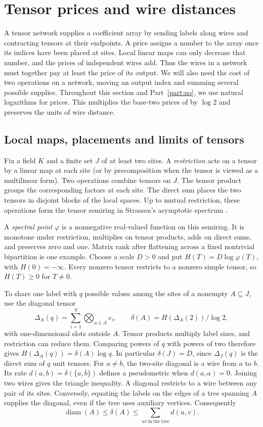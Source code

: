 \section{Tensor prices and wire distances}\label{sec:prices}

A tensor network supplies a coefficient array by sending labels along
wires and contracting tensors at their endpoints. A price assigns a
number to the array once its indices have been placed at sites. Local
linear maps can only decrease that number, and the prices of independent
wires add. Thus the wires in a network must together pay at least the
price of its output. We will also need the cost of two operations on a
network, moving an output index and summing several possible supplies.
Throughout this section and Part~\ref{part:no}, we use natural logarithms
for prices. This multiplies the base-two prices of \cite{oaG} by
$\log 2$ and preserves the units of wire distance.

\subsection{Local maps, placements and limits of tensors}

Fix a field $K$ and a finite set $J$ of at least two sites. A
\emph{restriction} acts on a tensor by a linear map at each site
(or by precomposition when the tensor is viewed as a multilinear
form). Two operations combine tensors on $J$. The tensor product
groups the corresponding factors at each site. The direct sum places
the two tensors in disjoint blocks of the local spaces. Up to mutual
restriction, these operations form the tensor semiring in Strassen's
asymptotic spectrum \cite{Strassen}.

A \emph{spectral point} $\varphi$ is a nonnegative real-valued
function on this semiring. It is monotone under restriction,
multiplies on tensor products, adds on direct sums, and preserves
zero and one. Matrix rank after flattening across a fixed nontrivial
bipartition is one example. Choose a scale $D>0$ and put
$H(T)=D\log\varphi(T)$, with $H(0)=-\infty$. Every nonzero tensor
restricts to a nonzero simple tensor, so $H(T)\ge0$ for $T\ne0$.

To share one label with $q$ possible values among the sites of a
nonempty $A\subseteq J$, use the diagonal tensor
\[
 \Delta_A(q)=\sum_{i=1}^q\bigotimes_{a\in A}e_i,\qquad
 \delta(A)=H(\Delta_A(2))/\log 2 ,
\]
with one-dimensional slots outside $A$. Tensor products multiply
label sizes, and restriction can reduce them. Comparing powers of
$q$ with powers of two therefore gives $H(\Delta_A(q))=\delta(A)\log q$.
In particular $\delta(J)=D$, since $\Delta_J(q)$ is the direct sum of
$q$ unit tensors. For $a\ne b$, the two-site diagonal is a wire from
$a$ to $b$. Its rate $d(a,b)=\delta(\{a,b\})$ defines a pseudometric
when $d(a,a)=0$. Joining two wires gives the triangle inequality.
A diagonal restricts to a wire between any pair of its sites.
Conversely, equating the labels on the edges of a tree spanning $A$
supplies the diagonal, even if the tree uses auxiliary vertices.
Consequently
\[
    \operatorname{diam}(A)\leq\delta(A)\leq
    \sum_{uv\ \mathrm{in\ the\ tree}}d(u,v).
\]

